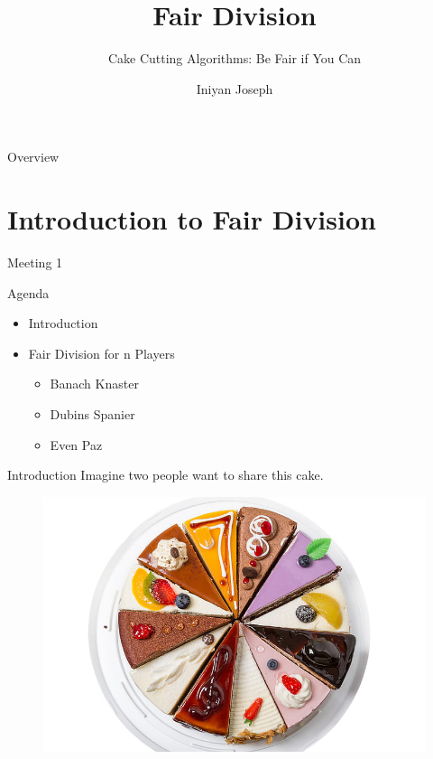 \documentclass[aspectratio=169,xcolor=dvipsnames]{beamer}
\title[short title]{Fair Division} %
\subtitle{Cake Cutting Algorithms: Be Fair if You Can}
\author[Iniyan Joseph] {Iniyan Joseph}
\institute[UTD] %
{
    University of Texas at Dallas %
}
\date{} %
\begin{document}
\begin{frame}
    \titlepage
\end{frame}

\begin{frame}[allowframebreaks]{Overview}
    \tableofcontents
\end{frame}

\section{Introduction to Fair Division}
\begin{frame}{Meeting 1}
	\begin{block}{Agenda}
		\begin{itemize}
			\item Introduction
			\item Fair Division for n Players
			\begin{itemize}
				\item Banach Knaster
				\item Dubins Spanier
				\item Even Paz
			\end{itemize}
		\end{itemize}
	\end{block}
\end{frame}
\begin{frame}{Introduction}
	Imagine two people want to share this cake.
	\begin{figure}
		\includegraphics[width=0.75\linewidth]{cakeImage}
	\end{figure}
\end{frame}
\end{document}
